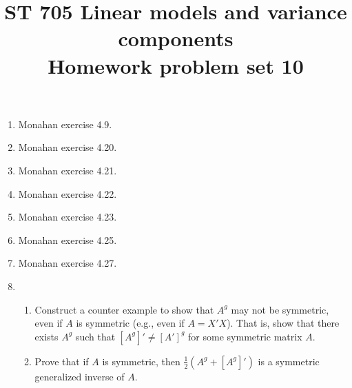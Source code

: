 \documentclass[11pt]{article}
\title{ST 705 Linear models and variance components \\ 
        Homework problem set 10}
\begin{document}
\maketitle

\begin{enumerate}

\item Monahan exercise 4.9.

\item Monahan exercise 4.20.

\item Monahan exercise 4.21.

\item Monahan exercise 4.22.

\item Monahan exercise 4.23.

\item Monahan exercise 4.25.

\item Monahan exercise 4.27.

\item 
\begin{enumerate}
\item Construct a counter example to show that $A^{g}$ may not be symmetric, even if $A$ is symmetric (e.g., even if $A = X'X$).  That is, show that there exists $A^g$ such that $[A^{g}]' \ne [A']^{g}$ for some symmetric matrix $A$.
\item Prove that if $A$ is symmetric, then $\frac{1}{2}(A^{g} + [A^{g}]')$ is a symmetric generalized inverse of $A$.
\end{enumerate}






\end{enumerate}
\end{document}
